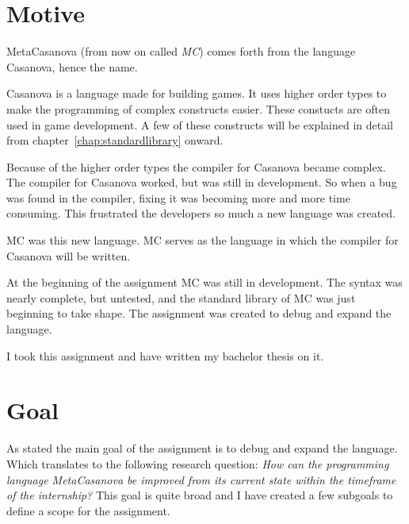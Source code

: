 

\section{Motive}

MetaCasanova (from now on called \emph{MC}) comes forth from the language Casanova, hence the name.

Casanova is a language made for building games.
It uses higher order types to make the programming of complex constructs easier.
These constucts are often used in game development.
A few of these constructs will be explained in detail from chapter~\ref{chap:standardlibrary} onward.

Because of the higher order types the compiler for Casanova became complex.
The compiler for Casanova worked, but was still in development.
So when a bug was found in the compiler, fixing it was becoming more and more time consuming.
This frustrated the developers so much a new language was created.

MC was this new language.
MC serves as the language in which the compiler for Casanova will be written.

At the beginning of the assignment MC was still in development.
The syntax was nearly complete, but untested, and the standard library of MC was just beginning to take shape.
The assignment was created to debug and expand the language.

I took this assignment and have written my bachelor thesis on it.

\section{Goal}
As stated the main goal of the assignment is to debug and expand the language.
Which translates to the following research question:
\emph{How can the programming language MetaCasanova be improved from its current state within the timeframe of the internship?}
This goal is quite broad and I have created a few subgoals to define a scope for the assignment.

